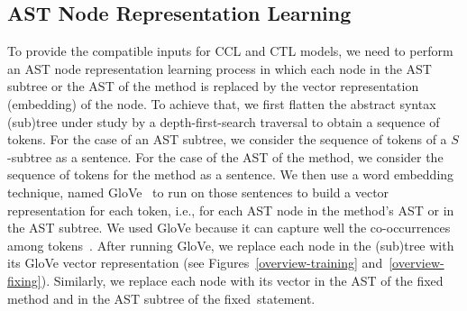 \subsection{AST Node Representation Learning}

To provide the compatible inputs for CCL and CTL models, we need to
perform an AST node representation learning process in which each node
in the AST subtree or the AST of the method is replaced by the vector
representation (embedding) of the node. To achieve that, we first
flatten the abstract syntax (sub)tree under study by a
depth-first-search traversal to obtain a sequence of tokens. For the
case of an AST subtree, we consider the sequence of tokens of a
$S$-subtree as a sentence. For the case of the AST of the method, we
consider the sequence of tokens for the method as a sentence. We then
use a word embedding technique, named GloVe~\cite{pennington2014glove}
to run on those sentences to build a vector representation for each
token, i.e., for each AST node in the method's AST or in the AST
subtree. We used GloVe because it can capture well the co-occurrences
among tokens~\cite{pennington2014glove}. After running GloVe, we
replace each node in the (sub)tree with its GloVe vector
representation (see Figures~\ref{overview-training}
and~\ref{overview-fixing}). Similarly, we replace each node with its
vector in the AST of the fixed method and in the AST subtree of the
fixed~statement.


